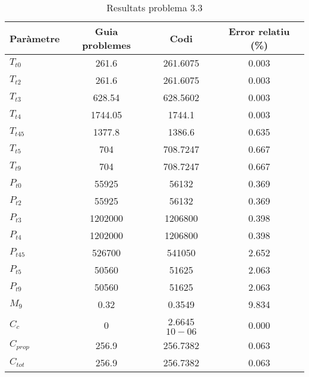 \begin{table}[H]
\centering
\begin{tabular}{lccc}
\toprule[3pt]
Paràmetre & Guia problemes & Codi       & Error relatiu (\%) \\ \midrule[1pt]
$T_{t0}$       & 261.6          & 261.6075   & 0.003              \\
$T_{t2}$      & 261.6          & 261.6075   & 0.003              \\
$T_{t3}$      & 628.54         & 628.5602   & 0.003              \\
$T_{t4}$       & 1744.05        & 1744.1     & 0.003              \\
$T_{t45}$     & 1377.8         & 1386.6     & 0.635              \\
$T_{t5}$       & 704            & 708.7247   & 0.667              \\
$T_{t9}$      & 704            & 708.7247   & 0.667              \\
$P_{t0}$       & 55925          & 56132      & 0.369              \\
$P_{t2}$      & 55925          & 56132      & 0.369              \\
$P_{t3}$       & 1202000        & 1206800    & 0.398              \\
$P_{t4}$       & 1202000        & 1206800    & 0.398              \\
$P_{t45}$     & 526700         & 541050     & 2.652              \\
$P_{t5}$      & 50560          & 51625      & 2.063              \\
$P_{t9}$       & 50560          & 51625      & 2.063              \\
$M_9$        & 0.32           & 0.3549     & 9.834              \\
$C_c$        & 0              & 2.6645$10-06$ & 0.000              \\
$C_{prop}$     & 256.9          & 256.7382   & 0.063              \\
$C_{tot}$      & 256.9          & 256.7382   & 0.063              \\ \bottomrule[2pt]
\end{tabular}
\caption{Resultats problema 3.3}
\end{table}
